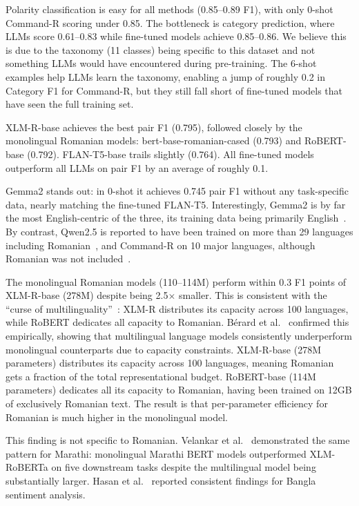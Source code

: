 \documentclass[12pt,a4paper]{report}
\begin{document}
Polarity classification is easy for all methods (0.85--0.89 F1), with only 0-shot Command-R scoring under 0.85. The bottleneck is category prediction, where LLMs score 0.61--0.83 while fine-tuned models achieve 0.85--0.86. We believe this is due to the taxonomy (11 classes) being specific to this dataset and not something LLMs would have encountered during pre-training. The 6-shot examples help LLMs learn the taxonomy, enabling a jump of roughly 0.2 in Category F1 for Command-R, but they still fall short of fine-tuned models that have seen the full training set.

XLM-R-base achieves the best pair F1 (0.795), followed closely by the monolingual Romanian models: bert-base-romanian-cased (0.793) and RoBERT-base (0.792). FLAN-T5-base trails slightly (0.764). All fine-tuned models outperform all LLMs on pair F1 by an average of roughly 0.1.

Gemma2 stands out: in 0-shot it achieves 0.745 pair F1 without any task-specific data, nearly matching the fine-tuned FLAN-T5. Interestingly, Gemma2 is by far the most English-centric of the three, its training data being primarily English~\cite{team2024gemma}. By contrast, Qwen2.5 is reported to have been trained on more than 29 languages including Romanian~\cite{hui2024qwen2}, and Command-R on 10 major languages, although Romanian was not included~\cite{cohere2024commandr}.

The monolingual Romanian models (110--114M) perform within 0.3 F1 points of XLM-R-base (278M) despite being 2.5$\times$ smaller. This is consistent with the ``curse of multilinguality''~\cite{chang2023multilinguality}: XLM-R distributes its capacity across 100 languages, while RoBERT dedicates all capacity to Romanian. Bérard et al.~\cite{berard2026capacity} confirmed this empirically, showing that multilingual language models consistently underperform monolingual counterparts due to capacity constraints. XLM-R-base (278M parameters) distributes its capacity across 100 languages, meaning Romanian gets a fraction of the total representational budget. RoBERT-base (114M parameters) dedicates all its capacity to Romanian, having been trained on 12GB of exclusively Romanian text. The result is that per-parameter efficiency for Romanian is much higher in the monolingual model.

This finding is not specific to Romanian. Velankar et al.~\cite{velankar2022mono} demonstrated the same pattern for Marathi: monolingual Marathi BERT models outperformed XLM-RoBERTa on five downstream tasks despite the multilingual model being substantially larger. Hasan et al.~\cite{tanvir2023bangla} reported consistent findings for Bangla sentiment analysis.
\end{document}

